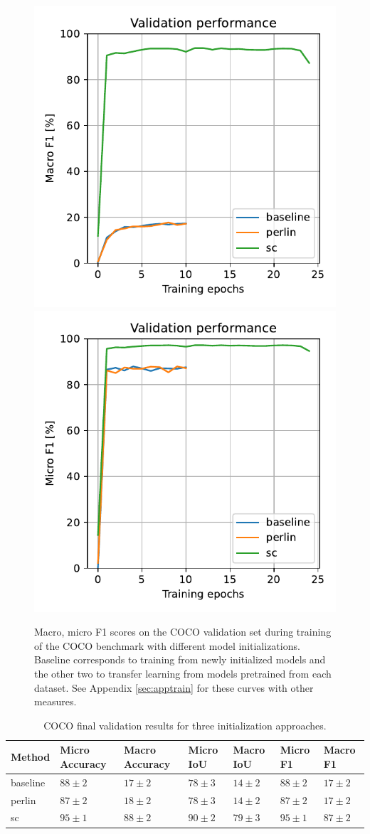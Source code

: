 \documentclass[12pt,fleqn]{article}
\begin{document}
\begin{figure}[H]
    \centering
        \includegraphics[width=.49\linewidth]{coco/Macro F1}
        \includegraphics[width=.49\linewidth]{coco/Micro F1}
    \caption{
        Macro, micro F1 scores on the COCO validation set during training of the COCO benchmark with different model initializations. Baseline corresponds to training from newly initialized models and the other two to transfer learning from models pretrained from each dataset. See Appendix \ref{sec:apptrain} for these curves with other measures.
    }
    \label{fig:cococurves}
\end{figure}\noindent


\begin{table}[H]
    \small
    \centering
    \begin{tabular}{l|llllll}
            Method & Micro Accuracy & Macro Accuracy & Micro IoU & Macro IoU & Micro F1 & Macro F1 \\
            \hline
            baseline & $88 \pm 2$ & $17 \pm 2$ & $78 \pm 3$ & $14 \pm 2$ & $88 \pm 2$ & $17 \pm 2$ \\
            perlin & $87 \pm 2$ & $18 \pm 2$ & $78 \pm 3$ & $14 \pm 2$ & $87 \pm 2$ & $17 \pm 2$ \\
            sc & $95 \pm 1$ & $88 \pm 2$ & $90 \pm 2$ & $79 \pm 3$ & $95 \pm 1$ & $87 \pm 2$ \\
    \end{tabular}
    \caption{
        COCO final validation results for three initialization approaches.
    }
    \label{tab:cocofinal}
\end{table}\noindent
\end{document}
